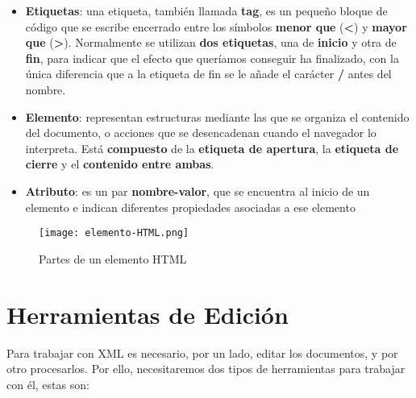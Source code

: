 \begin{itemize}
    \item \textbf{Etiquetas}: una etiqueta, también llamada \textbf{tag}, es un pequeño bloque de código que se escribe encerrado entre los símbolos \textbf{menor que} (\textbf{<}) y \textbf{mayor que} (\textbf{>}). Normalmente se utilizan \textbf{dos etiquetas}, una de \textbf{inicio} y otra de \textbf{fin}, para indicar que el efecto que queríamos conseguir ha finalizado, con la única diferencia que a la etiqueta de fin se le añade el carácter \textbf{/} antes del nombre.
    \item \textbf{Elemento}: representan estructuras mediante las que se organiza el contenido del documento, o acciones que se desencadenan cuando el navegador lo interpreta. Está \textbf{compuesto} de la \textbf{etiqueta de apertura}, la \textbf{etiqueta de cierre} y el \textbf{contenido entre ambas}.
    \item \textbf{Atributo}: es un par \textbf{nombre-valor}, que se encuentra al inicio de un elemento e indican diferentes propiedades asociadas a ese elemento
\end{itemize}

\begin{figure}[h]
    \centering
    \texttt{[image: elemento-HTML.png]}
    \caption{Partes de un elemento HTML}
\end{figure}

\section{Herramientas de Edición}
Para trabajar con XML es necesario, por un lado, editar los documentos, y por otro procesarlos. Por ello, necesitaremos dos tipos de herramientas para trabajar con él, estas son:

